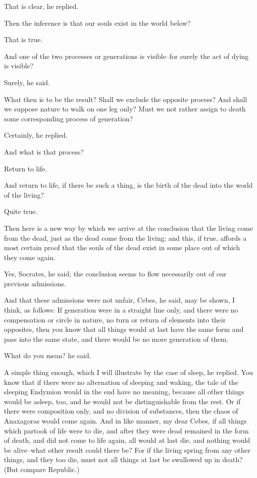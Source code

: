 That is clear, he replied.

Then the inference is that our souls exist in the world below?

That is true.

And one of the two processes or generations is visible--for surely the
act of dying is visible?

Surely, he said.

What then is to be the result? Shall we exclude the opposite process?
And shall we suppose nature to walk on one leg only? Must we not rather
assign to death some corresponding process of generation?

Certainly, he replied.

And what is that process?

Return to life.

And return to life, if there be such a thing, is the birth of the dead
into the world of the living?

Quite true.

Then here is a new way by which we arrive at the conclusion that the
living come from the dead, just as the dead come from the living; and
this, if true, affords a most certain proof that the souls of the dead
exist in some place out of which they come again.

Yes, Socrates, he said; the conclusion seems to flow necessarily out of
our previous admissions.

And that these admissions were not unfair, Cebes, he said, may be shown,
I think, as follows: If generation were in a straight line only, and
there were no compensation or circle in nature, no turn or return of
elements into their opposites, then you know that all things would at
last have the same form and pass into the same state, and there would be
no more generation of them.

What do you mean? he said.

A simple thing enough, which I will illustrate by the case of sleep,
he replied. You know that if there were no alternation of sleeping
and waking, the tale of the sleeping Endymion would in the end have no
meaning, because all other things would be asleep, too, and he would not
be distinguishable from the rest. Or if there were composition only,
and no division of substances, then the chaos of Anaxagoras would come
again. And in like manner, my dear Cebes, if all things which partook
of life were to die, and after they were dead remained in the form
of death, and did not come to life again, all would at last die, and
nothing would be alive--what other result could there be? For if the
living spring from any other things, and they too die, must not all
things at last be swallowed up in death? (But compare Republic.)

